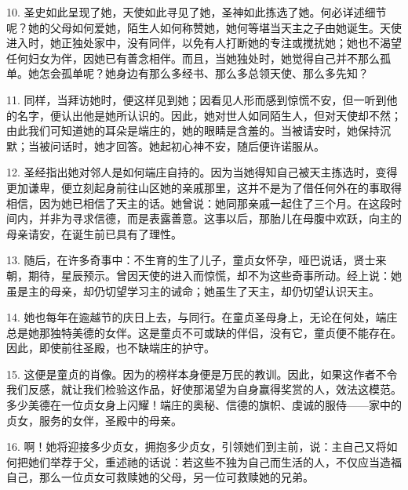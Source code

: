 10. 圣史如此呈现了她，天使如此寻见了她，圣神如此拣选了她。何必详述细节呢？她的父母如何爱她，陌生人如何称赞她，她何等堪当天主之子由她诞生。天使进入时，她正独处家中，没有同伴，以免有人打断她的专注或搅扰她；她也不渴望任何妇女为伴，因她已有善念相伴。而且，当她独处时，她觉得自己并不那么孤单。她怎会孤单呢？她身边有那么多经书、那么多总领天使、那么多先知？\par

11. 同样，当拜访她时，便这样见到她；因看见人形而感到惊慌不安，但一听到他的名字，便认出他是她所认识的。因此，她对世人如同陌生人，但对天使却不然；由此我们可知道她的耳朵是端庄的，她的眼睛是含羞的。当被请安时，她保持沉默；当被问话时，她才回答。她起初心神不安，随后便许诺服从。\par

12. 圣经指出她对邻人是如何端庄自持的。因为当她得知自己被天主拣选时，变得更加谦卑，便立刻起身前往山区她的亲戚那里，这并不是为了借任何外在的事取得相信，因为她已相信了天主的话。她曾说：她同那亲戚一起住了三个月。在这段时间内，并非为寻求信德，而是表露善意。这事以后，那胎儿在母腹中欢跃，向主的母亲请安，在诞生前已具有了理性。\par

13. 随后，在许多奇事中：不生育的生了儿子，童贞女怀孕，哑巴说话，贤士来朝，期待，星辰预示。曾因天使的进入而惊慌，却不为这些奇事所动。经上说：她虽是主的母亲，却仍切望学习主的诫命；她虽生了天主，却仍切望认识天主。\par

14. 她也每年在逾越节的庆日上去，与同行。在童贞圣母身上，无论在何处，端庄总是她那独特美德的女伴。这是童贞不可或缺的伴侣，没有它，童贞便不能存在。因此，即使前往圣殿，也不缺端庄的护守。\par

15. 这便是童贞的肖像。因为的榜样本身便是万民的教训。因此，如果这作者不令我们反感，就让我们检验这作品，好使那渴望为自身赢得奖赏的人，效法这模范。多少美德在一位贞女身上闪耀！端庄的奥秘、信德的旗帜、虔诚的服侍——家中的贞女，服务的女伴，圣殿中的母亲。\par

16. 啊！她将迎接多少贞女，拥抱多少贞女，引领她们到主前，说：主自己又将如何把她们举荐于父，重述祂的话说：若这些不独为自己而生活的人，不仅应当造福自己，那么一位贞女可救赎她的父母，另一位可救赎她的兄弟。\par

